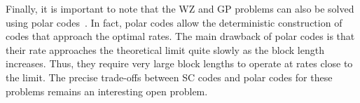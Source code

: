 Finally, it is important to note that the WZ and GP problems can also be solved using polar codes~\cite{Korada-it10}.
In fact, polar codes allow the deterministic construction of codes that approach the optimal rates.
The main drawback of polar codes is that their rate approaches the theoretical limit quite slowly as the block length increases.
Thus, they require very large block lengths to operate at rates close to the limit.
The precise trade-offs between SC codes and polar codes for these problems remains an interesting open problem.

